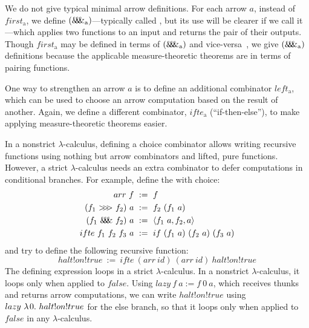 \documentclass{llncs}
\newcommand{\arrowarr}{\ensuremath{arr}}
\newcommand{\arrowcomp}{\ensuremath{{>}\mspace{-6mu}{>}\mspace{-6mu}{>}}}
\newcommand{\arrowpair}{\ensuremath{\mathit{\&\mspace{-7.5mu}\&\mspace{-7.5mu}\&}}}
\newcommand{\arrowif}{\ensuremath{ifte}}
\newcommand{\arrowlazy}{\ensuremath{lazy}}
\newcommand{\gen}{_\mathrm{a}}
\begin{document}
We do not give typical minimal arrow definitions.
For each arrow $a$, instead of $first\gen$, we define $(\arrowpair\gen)$---typically called , but its use will be clearer if we call it ---which applies two functions to an input and returns the pair of their outputs.
Though $first\gen$ may be defined in terms of $(\arrowpair\gen)$ and vice-versa~\cite{cit:hughes-2000scp-arrows}, we give $(\arrowpair\gen)$ definitions because the applicable measure-theoretic theorems are in terms of pairing functions.

One way to strengthen an arrow $a$ is to define an additional combinator $left\gen$, which can be used to choose an arrow computation based on the result of another.
Again, we define a different combinator, $\arrowif\gen$ (``if-then-else''), to make applying measure-theoretic theorems easier.

In a nonstrict $\lambda$-calculus, defining a choice combinator allows writing recursive functions using nothing but arrow combinators and lifted, pure functions.
However, a strict $\lambda$-calculus needs an extra combinator to defer computations in conditional branches.
For example, define the  with choice:
\begin{equation}
\begin{aligned}
	\arrowarr~f &\ := \ f \\
	(f_1~\arrowcomp~f_2)~a &\ := \ f_2~(f_1~a) \\
	(f_1~\arrowpair~f_2)~a &\ := \ \pair{f_1~a,f_2,a} \\
	\arrowif~f_1~f_2~f_3~a &\ := \ if~(f_1~a)~(f_2~a)~(f_3~a) \\
\end{aligned}
\label{eqn:function-arrow}
\end{equation}
and try to define the following recursive function:
\begin{equation}
	halt!on!true \ := \ \arrowif~(\arrowarr~id)~(\arrowarr~id)~halt!on!true
\end{equation}
The defining expression loops in a strict $\lambda$-calculus.
In a nonstrict $\lambda$-calculus, it loops only when applied to $false$.
Using $\arrowlazy~f~a := f~0~a$, which receives thunks and returns arrow computations, we can write $halt!on!true$ using $\arrowlazy~\fun{0}{halt!on!true}$ for the else branch, so that it loops only when applied to $false$ in any $\lambda$-calculus.
\end{document}
